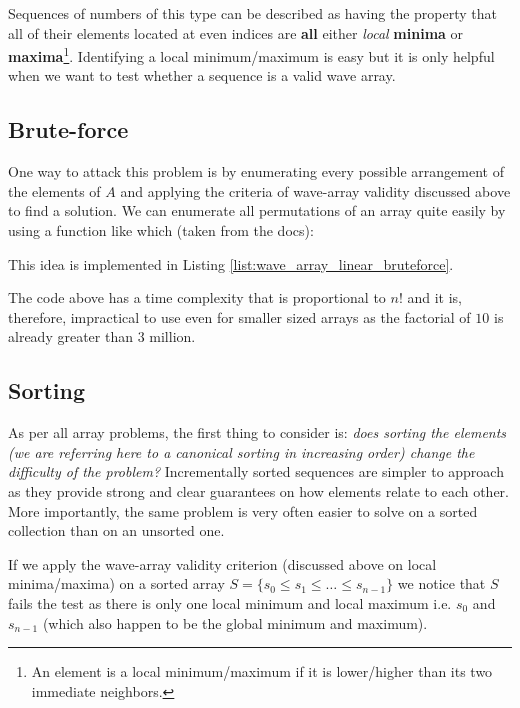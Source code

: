 Sequences of numbers of this type can be described as having the property that all of their elements located at even indices are \textbf{all} either 
\textit{local}  \textbf{minima} or  \textbf{maxima}\footnote{An element is a local minimum/maximum if it is lower/higher than its two immediate neighbors.}. 
Identifying a local minimum/maximum is easy but it is only helpful when we want to test whether a sequence is a valid wave array.

\subsection{Brute-force}
\label{wave_array:sec:bruteforce}
One way to attack this problem is by enumerating every possible arrangement of the elements of $A$ and applying the criteria of wave-array validity discussed above to find a solution. 
We can enumerate all permutations of an array quite easily by using a function like  which (taken from the docs): \quoteblock{"Rearranges the elements in the range [first,last) into the next lexicographically greater permutation".}

This idea is implemented in Listing \ref{list:wave_array_linear_bruteforce}.



The code above has a time complexity that is proportional to $n!$ and it is, therefore, impractical to use even for smaller sized arrays as the factorial of $10$ is already greater than $3$ million. 

\subsection{Sorting}
\label{wave_array:sec:sorting}
As per all array problems, the first thing to consider is: \textit{does sorting the elements (we are referring here to a canonical sorting in increasing order) change the difficulty of the problem?}
Incrementally sorted sequences are simpler to approach as they provide strong and clear guarantees on how elements relate to each other. More importantly, the same problem is very often easier to solve on a sorted collection than on an unsorted one.
 
If we apply the wave-array validity criterion (discussed above on local minima/maxima) on a sorted array $S=\{s_0 \leq s_1 \leq \ldots \leq s_{n-1}\}$ we notice that $S$ fails the test as there is only one local minimum and local maximum i.e. $s_0$ and $s_{n-1}$ (which also happen to be the global minimum and maximum).

